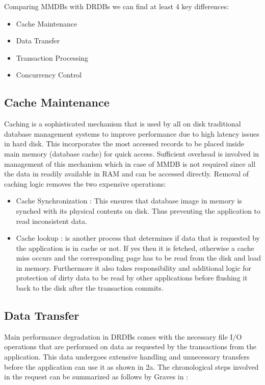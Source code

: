 \documentclass[12pt]{article} %
\begin{document}
Comparing MMDBs with DRDBs we can find at least 4 key differences:

\begin{itemize}
\item Cache Maintenance
\item Data Transfer
\item Transaction Processing
\item Concurrency Control 
\end{itemize}

\subsection{Cache Maintenance}
Caching is a sophisticated mechanism that is used by all on disk traditional database management systems to improve performance due to high latency issues in hard disk. This incorporates the most accessed records to be placed inside main memory (database cache) for quick access. Sufficient overhead is involved in management of this mechanism which in case of MMDB is not required since all the data in readily available in RAM and can be accessed directly. Removal of caching logic removes the two expensive operations:

\begin{itemize}
\item Cache Synchronization : This ensures that database image in memory is synched with its physical contents on disk. Thus preventing the application to read inconsistent data. 

\item Cache lookup : is another process that determines if data that is requested by the application is in cache or not. If yes then it is fetched, otherwise a cache miss occurs and the corresponding page has to be read from the disk and load in memory. Furthermore it also takes responsibility and additional logic for protection of dirty data to be read by other applications before flushing it back to the disk after the transaction commits.
\end{itemize}


\subsection{Data Transfer}
Main performance degradation in DRDBs comes with the necessary file I/O operations that are performed on data as requested by the transactions from the application. This data undergoes extensive handling and unnecessary transfers before the application can use it as shown in \figurename{2a}. The chronological steps involved in the request can be summarized as follows by Graves in \cite{graves2002memory}:
\end{document}
